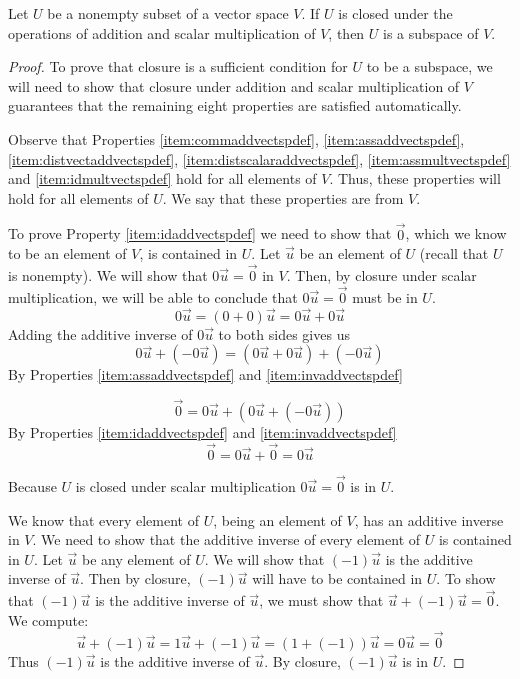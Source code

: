 \documentclass{ximera}
\begin{document}
\begin{theorem}
Let $U$ be a nonempty subset of a vector space $V$.  If $U$ is closed under the operations of addition and scalar multiplication of $V$, then $U$ is a subspace of $V$.
\end{theorem}
\begin{proof}
To prove that closure is a sufficient condition for $U$ to be a subspace, we will need to show that closure under addition and scalar multiplication of $V$ guarantees that the remaining eight properties are satisfied automatically.  

Observe that Properties \ref{item:commaddvectspdef}, \ref{item:assaddvectspdef}, \ref{item:distvectaddvectspdef}, \ref{item:distscalaraddvectspdef}, \ref{item:assmultvectspdef} and \ref{item:idmultvectspdef} hold for all elements of $V$.  Thus, these properties will hold for all elements of $U$.  We say that these properties are  from $V$.

To prove Property \ref{item:idaddvectspdef} we need to show that $\vec{0}$, which we know to be an element of $V$, is contained in $U$.  Let $\vec{u}$ be an element of $U$ (recall that $U$ is nonempty).  We will show that $0\vec{u}=\vec{0}$ in $V$.  Then, by closure under scalar multiplication, we will be able to conclude that $0\vec{u}=\vec{0}$ must be in $U$.
$$0\vec{u}=(0+0)\vec{u}=0\vec{u}+0\vec{u}$$
Adding the additive inverse of $0\vec{u}$ to both sides gives us
$$0\vec{u}+(-0\vec{u})=(0\vec{u}+0\vec{u})+(-0\vec{u})$$
By Properties \ref{item:assaddvectspdef} and \ref{item:invaddvectspdef}

$$\vec{0}=0\vec{u}+(0\vec{u}+(-0\vec{u}))$$
By Properties \ref{item:idaddvectspdef} and \ref{item:invaddvectspdef}
$$\vec{0}=0\vec{u}+\vec{0}=0\vec{u}$$

Because $U$ is closed under scalar multiplication $0\vec{u}=\vec{0}$ is in $U$.

We know that every element of $U$, being an element of $V$, has an additive inverse  in $V$.  We need to show that the additive inverse of every element of $U$ is contained in $U$. Let $\vec{u}$ be any element of $U$.  We will show that $(-1)\vec{u}$ is the additive inverse of $\vec{u}$.  Then by closure, $(-1)\vec{u}$ will have to be contained in $U$.  To show that $(-1)\vec{u}$ is the additive inverse of $\vec{u}$, we must show that $\vec{u}+(-1)\vec{u}=\vec{0}$.  We compute:
$$\vec{u}+(-1)\vec{u}=1\vec{u}+(-1)\vec{u}=(1+(-1))\vec{u}=0\vec{u}=\vec{0}$$
Thus $(-1)\vec{u}$ is the additive inverse of $\vec{u}$. By closure, $(-1)\vec{u}$ is in $U$.  
\end{proof}
\end{document}

